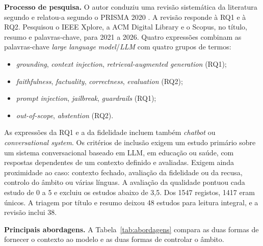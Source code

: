 \documentclass[11pt,a4paper]{article}
\begin{document}
\textbf{Processo de pesquisa.} O autor conduziu uma revisão sistemática da literatura segundo \textcite{kitchenham2007guidelines} e relatou-a segundo o PRISMA 2020 \parencite{page2021prisma}. A revisão responde à RQ1 e à RQ2. Pesquisou o IEEE Xplore, a ACM Digital Library e o Scopus, no título, resumo e palavras-chave, para 2021 a 2026. Quatro expressões combinam as palavras-chave \emph{large language model}/\emph{LLM} com quatro grupos de termos:
\begin{itemize}
    \item \emph{grounding}, \emph{context injection}, \emph{retrieval-augmented generation} (RQ1);
    \item \emph{faithfulness}, \emph{factuality}, \emph{correctness}, \emph{evaluation} (RQ2);
    \item \emph{prompt injection}, \emph{jailbreak}, \emph{guardrails} (RQ1);
    \item \emph{out-of-scope}, \emph{abstention} (RQ2).
\end{itemize}
As expressões da RQ1 e a da fidelidade incluem também \emph{chatbot} ou \emph{conversational system}. Os critérios de inclusão exigem um estudo primário sobre um sistema conversacional baseado em LLM, em educação ou saúde, com respostas dependentes de um contexto definido e avaliadas. Exigem ainda proximidade ao caso: contexto fechado, avaliação da fidelidade ou da recusa, controlo do âmbito ou várias línguas. A avaliação da qualidade pontuou cada estudo de 0 a 5 e excluiu os estudos abaixo de 3,5. Dos 1547 registos, 1417 eram únicos. A triagem por título e resumo deixou 48 estudos para leitura integral, e a revisão inclui 38.

\textbf{Principais abordagens.} A Tabela~\ref{tab:abordagens} compara as duas formas de fornecer o contexto ao modelo e as duas formas de controlar o âmbito.
\end{document}
